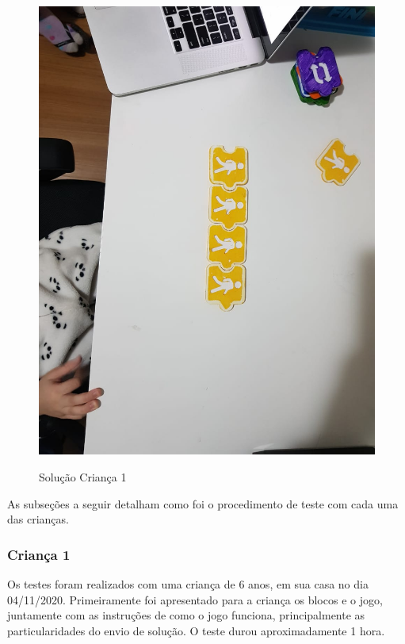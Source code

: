 \begin{figure}[H]
    \caption{Solução Criança 1}
    \centering
    \includegraphics[width=\linewidth]{Imagens/Cap5/Teste_crianca_1.jpeg}
    \label{figura:solucao_crianca_1}
\end{figure}

As subseções a seguir detalham como foi o procedimento de teste com cada uma das crianças.

\subsubsection{Criança 1}

Os testes foram realizados com uma criança de 6 anos, em sua casa no dia 04/11/2020. Primeiramente foi apresentado para a criança os blocos e o jogo, juntamente com as instruções de como o jogo funciona, principalmente as particularidades do envio de solução. O teste durou aproximadamente 1 hora.


